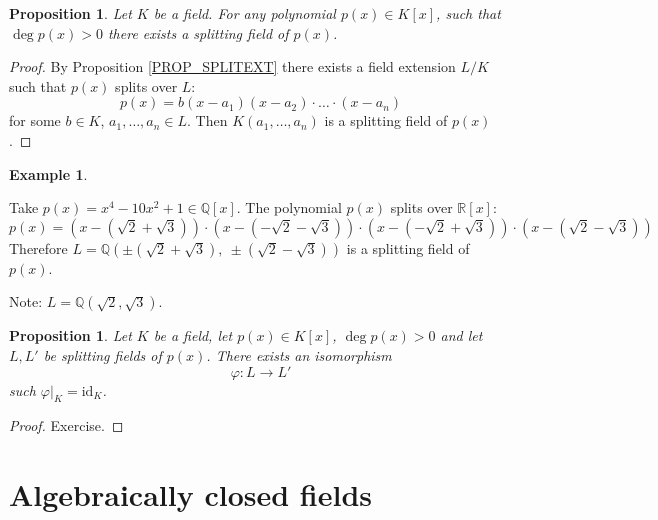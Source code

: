 \documentclass[12pt, letterpaper, oneside]{article}
\theoremstyle{plain}
\newtheorem{proposition}[theorem]{Proposition}
\theoremstyle{definition}
\newtheorem{example}[theorem]{Example}
\newcommand{\Q}{{\mathbb Q}}
\newcommand{\R}{{\mathbb R}}
\newcommand{\id}{\mathrm{id}}
\newcommand{\vs}{\vskip 5mm}
\begin{document}
\vs\vs

\begin{proposition}
\label{PROP_SPLITFLDEXISTS}
Let $K$ be a field. For any polynomial $p(x)\in K[x]$, such that $\deg p(x) > 0$ there exists 
a splitting field of $p(x)$.
\end{proposition}


\begin{proof}
By Proposition \ref{PROP_SPLITEXT} there exists a field extension $L/K$  such that 
$p(x)$ splits over $L$:
$$p(x) = b(x-a_{1})(x-a_{2})\cdot{\dots}\cdot (x-a_{n})$$
for some $b\in K$, $a_{1}, \dots, a_{n}\in L$. Then $K(a_{1}, \dots, a_{n})$ is a 
splitting field of $p(x)$. 
\end{proof}


\vs\vs

\begin{example}\ 


Take $p(x) = x^{4}-10x^{2}+1 \in \Q[x]$. The polynomial  $p(x)$ splits over $\R[x]$:
$$p(x) = (x-(\sqrt{2} + \sqrt{3}))\cdot  (x-(-\sqrt{2} - \sqrt{3}))\cdot  (x-(-\sqrt{2} + \sqrt{3}))
\cdot  (x-(\sqrt{2} - \sqrt{3}))$$ 
Therefore $L = \Q(\pm(\sqrt{2}+\sqrt{3}), \ \pm(\sqrt{2}-\sqrt{3}))$ is a splitting field of $p(x)$. 

Note: $L = \Q(\sqrt{2}, \sqrt{3})$.
\end{example}


\vs\vs


\begin{proposition}
\label{PROP_SPLITFLDUNIQUE}
Let $K$ be a field, let $p(x)\in K[x]$, $\deg p(x) >0$ and let $L, L'$ be splitting fields of 
$p(x)$. There exists an isomorphism 
$$\varphi\colon L \to L'$$
such $\varphi|_{K} = \id_{K}$. 
\end{proposition}


\vs

\begin{proof}
Exercise. 
\end{proof}









\newpage
\section{Algebraically closed fields}
\label{SEC_ALGCLODESFIELDS}
\end{document}
